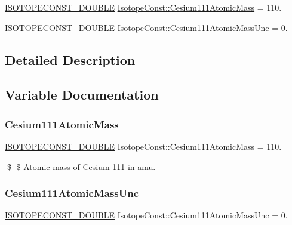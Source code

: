 \begin{DoxyCompactItemize}
\item 
\mbox{\hyperlink{group___isotope_const-_macros_ga8f45a7272ce02c0b4c65c44636ed719a}{I\+S\+O\+T\+O\+P\+E\+C\+O\+N\+S\+T\+\_\+\+D\+O\+U\+B\+LE}} \mbox{\hyperlink{group___isotope_const-_cesium-_cs111_ga847e96b673b91b75d1bb7802ec8096ba}{Isotope\+Const\+::\+Cesium111\+Atomic\+Mass}} = 110.
\item 
\mbox{\hyperlink{group___isotope_const-_macros_ga8f45a7272ce02c0b4c65c44636ed719a}{I\+S\+O\+T\+O\+P\+E\+C\+O\+N\+S\+T\+\_\+\+D\+O\+U\+B\+LE}} \mbox{\hyperlink{group___isotope_const-_cesium-_cs111_ga3e6821b752916e956b2a0a0e6b960307}{Isotope\+Const\+::\+Cesium111\+Atomic\+Mass\+Unc}} = 0.
\end{DoxyCompactItemize}


\subsection{Detailed Description}


\subsection{Variable Documentation}
\mbox{\label{group___isotope_const-_cesium-_cs111_ga847e96b673b91b75d1bb7802ec8096ba}} 
\subsubsection{\texorpdfstring{Cesium111\+Atomic\+Mass}{Cesium111AtomicMass}}
{\footnotesize\ttfamily \mbox{\hyperlink{group___isotope_const-_macros_ga8f45a7272ce02c0b4c65c44636ed719a}{I\+S\+O\+T\+O\+P\+E\+C\+O\+N\+S\+T\+\_\+\+D\+O\+U\+B\+LE}} Isotope\+Const\+::\+Cesium111\+Atomic\+Mass = 110.}

\$ \$ Atomic mass of Cesium-\/111 in amu. \mbox{\label{group___isotope_const-_cesium-_cs111_ga3e6821b752916e956b2a0a0e6b960307}} 
\subsubsection{\texorpdfstring{Cesium111\+Atomic\+Mass\+Unc}{Cesium111AtomicMassUnc}}
{\footnotesize\ttfamily \mbox{\hyperlink{group___isotope_const-_macros_ga8f45a7272ce02c0b4c65c44636ed719a}{I\+S\+O\+T\+O\+P\+E\+C\+O\+N\+S\+T\+\_\+\+D\+O\+U\+B\+LE}} Isotope\+Const\+::\+Cesium111\+Atomic\+Mass\+Unc = 0.}

